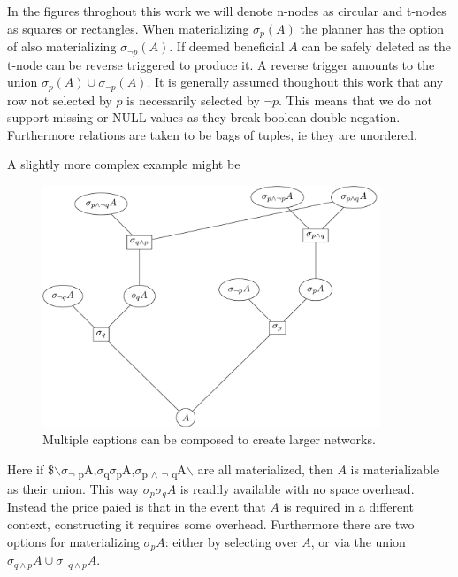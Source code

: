 In the figures throghout this work we will denote n-nodes as
circular and t-nodes as squares or rectangles. When materializing
\(\sigma_p(A)\) the planner has the option of also materializing
\(\sigma_{\neg p}(A)\). If deemed beneficial \(A\) can be safely
deleted as the t-node can be reverse triggered to produce it. A
reverse trigger amounts to the union \(\sigma_{p}(A) \cup
\sigma_{\neg p}(A)\). It is generally assumed thoughout this work
that any row not selected by \(p\) is necessarily selected by \(\neg
p\). This means that we do not support missing or NULL values as
they break boolean double negation. Furthermore relations are taken
to be bags of tuples, ie they are unordered.

A slightly more complex example might be

\begin{figure}[p]
  \centering
  \includegraphics[width=0.9\textwidth]{./imgs/selsub.pdf}
  \caption{\label{fig:orgd6664d1}Multiple captions can be composed to create larger networks.}
\end{figure}

Here if \$$\backslash${\(\sigma\)\textsubscript{\(\neg{}\) p}A,\(\sigma\)\textsubscript{q}\(\sigma\)\textsubscript{p}A,\(\sigma\)\textsubscript{p \(\land\) \(\neg{}\)
    q}A$\backslash$} are all materialized, then \(A\) is materializable as their
union. This way \(\sigma_p\sigma_qA\) is readily available with no space
overhead. Instead the price paied is that in the event that \(A\) is
required in a different context, constructing it requires some
overhead. Furthermore there are two options for materializing
\(\sigma_pA\): either by selecting over \(A\), or via the union
\(\sigma_{q \land p}A \cup \sigma_{\neg q \land p}A\).

